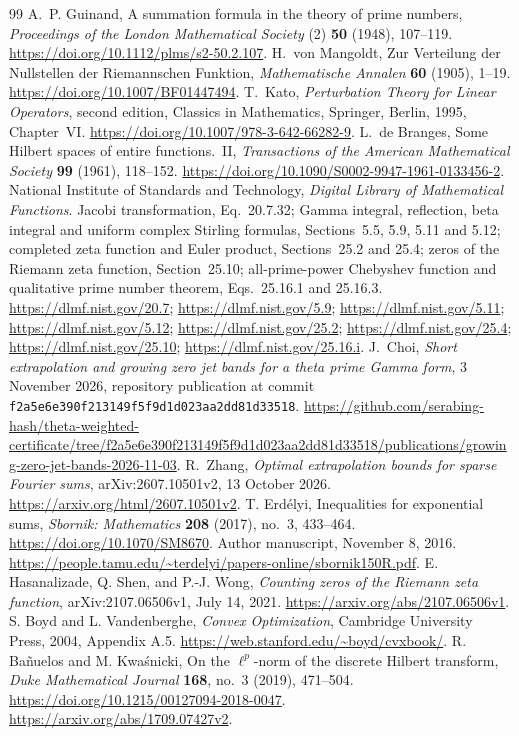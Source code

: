 \documentclass[11pt,a4paper]{article}
\numberwithin{equation}{section}
\theoremstyle{definition}\newtheorem{definition}[theorem]{Definition}
\theoremstyle{remark}\newtheorem{remark}[theorem]{Remark}
\begin{document}
\begin{thebibliography}{99}\small
{}
A.~P. Guinand, A summation formula in the theory of prime numbers,
\emph{Proceedings of the London Mathematical Society} (2) \textbf{50} (1948), 107--119.
\url{https://doi.org/10.1112/plms/s2-50.2.107}.
H.~von Mangoldt, Zur Verteilung der Nullstellen der Riemannschen Funktion,
\emph{Mathematische Annalen} \textbf{60} (1905), 1--19.
\url{https://doi.org/10.1007/BF01447494}.
T.~Kato, \emph{Perturbation Theory for Linear Operators}, second edition,
Classics in Mathematics, Springer, Berlin, 1995, Chapter~VI.
\url{https://doi.org/10.1007/978-3-642-66282-9}.
L.~de Branges, Some Hilbert spaces of entire functions.~II,
\emph{Transactions of the American Mathematical Society} \textbf{99} (1961), 118--152.
\url{https://doi.org/10.1090/S0002-9947-1961-0133456-2}.
National Institute of Standards and Technology, \emph{Digital Library of Mathematical Functions}.
Jacobi transformation, Eq.~20.7.32; Gamma integral, reflection, beta integral and uniform complex Stirling formulas, Sections~5.5, 5.9, 5.11 and 5.12; completed zeta function and Euler product, Sections~25.2 and 25.4; zeros of the Riemann zeta function, Section~25.10; all-prime-power Chebyshev function and qualitative prime number theorem, Eqs.~25.16.1 and 25.16.3.
\url{https://dlmf.nist.gov/20.7}; \url{https://dlmf.nist.gov/5.9};
\url{https://dlmf.nist.gov/5.11}; \url{https://dlmf.nist.gov/5.12};
\url{https://dlmf.nist.gov/25.2}; \url{https://dlmf.nist.gov/25.4}; \url{https://dlmf.nist.gov/25.10}; \url{https://dlmf.nist.gov/25.16.i}.
J.~Choi, \emph{Short extrapolation and growing zero jet bands for a theta
prime Gamma form}, 3 November 2026, repository publication at commit
\texttt{f2a5e6e390f213149f5f9d1d023aa2dd81d33518}.
\url{https://github.com/serabing-hash/theta-weighted-certificate/tree/f2a5e6e390f213149f5f9d1d023aa2dd81d33518/publications/growing-zero-jet-bands-2026-11-03}.
R.~Zhang, \emph{Optimal extrapolation bounds for sparse Fourier sums},
arXiv:2607.10501v2, 13 October 2026.
\url{https://arxiv.org/html/2607.10501v2}.
T. Erd\'elyi, Inequalities for exponential sums, \emph{Sbornik: Mathematics} \textbf{208} (2017), no.~3, 433--464. \url{https://doi.org/10.1070/SM8670}. Author manuscript, November 8, 2016.
\url{https://people.tamu.edu/~terdelyi/papers-online/sbornik150R.pdf}.
E. Hasanalizade, Q. Shen, and P.-J. Wong, \emph{Counting zeros of the Riemann zeta function}, arXiv:2107.06506v1, July 14, 2021.
\url{https://arxiv.org/abs/2107.06506v1}.
S. Boyd and L. Vandenberghe, \emph{Convex Optimization}, Cambridge University Press, 2004, Appendix A.5.
\url{https://web.stanford.edu/~boyd/cvxbook/}.
R. Ba\~nuelos and M. Kwa\'snicki, On the $\ell^p$-norm of the discrete Hilbert transform,
\emph{Duke Mathematical Journal} \textbf{168}, no.~3 (2019), 471--504.
\url{https://doi.org/10.1215/00127094-2018-0047}.
\url{https://arxiv.org/abs/1709.07427v2}.


\end{thebibliography}
\end{document}
